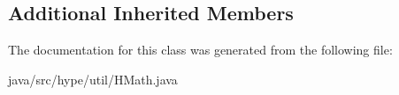 \subsection*{Additional Inherited Members}


The documentation for this class was generated from the following file\-:\begin{DoxyCompactItemize}
\item 
java/src/hype/util/H\-Math.\-java\end{DoxyCompactItemize}

